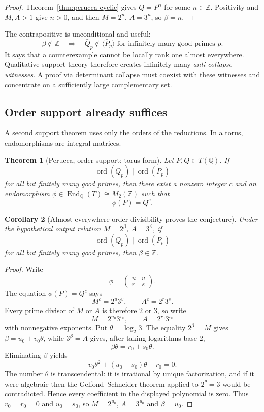 \documentclass[11pt]{article}
\newtheorem{theorem}{Theorem}[section]
\newtheorem{corollary}[theorem]{Corollary}
\theoremstyle{definition}
\theoremstyle{remark}
\newcommand{\Z}{\mathbb Z}
\newcommand{\Q}{\mathbb Q}
\newcommand{\ord}{\operatorname{ord}}
\begin{document}
\begin{proof}
Theorem~\ref{thm:perucca-cyclic} gives $Q=P^n$ for some $n\in\Z$.  Positivity and $M,A>1$ give $n>0$, and then $M=2^n$, $A=3^n$, so $\beta=n$.
\end{proof}

The contrapositive is unconditional and useful:
\begin{equation}
 \beta\notin\Z
 \quad\Longrightarrow\quad
 \bar Q_p\notin\langle\bar P_p\rangle
 \text{ for infinitely many good primes }p.
 \label{eq:noncyclic-witnesses}
\end{equation}
It says that a counterexample cannot be locally rank one almost everywhere.  Qualitative support theory therefore creates infinitely many \emph{anti-collapse witnesses}.  A proof via determinant collapse must coexist with these witnesses and concentrate on a sufficiently large complementary set.

\subsection{Order support already suffices}

A second support theorem uses only the orders of the reductions.  In a torus, endomorphisms are integral matrices.

\begin{theorem}[Perucca, order support; torus form]
\label{thm:perucca-order}
Let $P,Q\in T(\Q)$.  If
\[
 \ord(\bar Q_p)\mid\ord(\bar P_p)
\]
for all but finitely many good primes, then there exist a nonzero integer $c$ and an endomorphism
$\phi\in\operatorname{End}_{\Q}(T)\cong M_2(\Z)$ such that
\[
 \phi(P)=Q^c.
\]
\end{theorem}

\begin{corollary}[Almost-everywhere order divisibility proves the conjecture]
\label{cor:order-AE}
Under the hypothetical output relation $M=2^\beta$, $A=3^\beta$, if
\[
 \ord(\bar Q_p)\mid\ord(\bar P_p)
\]
for all but finitely many good primes, then $\beta\in\Z$.
\end{corollary}

\begin{proof}
Write
\[
 \phi=\begin{pmatrix}u&v\\ r&s\end{pmatrix}.
\]
The equation $\phi(P)=Q^c$ says
\[
 M^c=2^u3^v,
 \qquad
 A^c=2^r3^s.
\]
Every prime divisor of $M$ or $A$ is therefore $2$ or $3$, so write
\[
 M=2^{u_0}3^{v_0},
 \qquad A=2^{r_0}3^{s_0}
\]
with nonnegative exponents.  Put $\theta=\log_2 3$.  The equality $2^\beta=M$ gives
$\beta=u_0+v_0\theta$, while $3^\beta=A$ gives, after taking logarithms base $2$,
\[
 \beta\theta=r_0+s_0\theta.
\]
Eliminating $\beta$ yields
\[
 v_0\theta^2+(u_0-s_0)\theta-r_0=0.
\]
The number $\theta$ is transcendental: it is irrational by unique factorization, and if it were algebraic then the Gelfond--Schneider theorem applied to $2^\theta=3$ would be contradicted.  Hence every coefficient in the displayed polynomial is zero.  Thus $v_0=r_0=0$ and $u_0=s_0$, so $M=2^{u_0}$, $A=3^{u_0}$ and $\beta=u_0$.
\end{proof}
\end{document}
